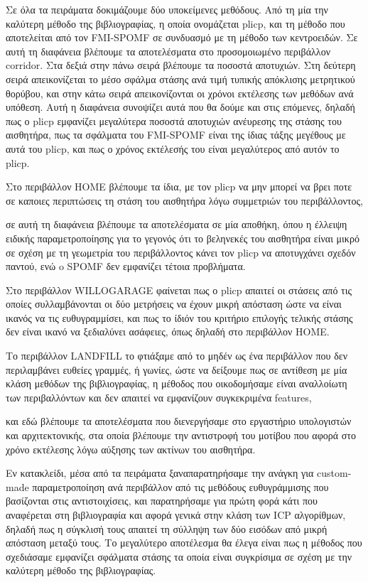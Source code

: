 \documentclass[a4paper,10pt]{article}
\begin{document}
Σε όλα τα πειράματα δοκιμάζουμε δύο υποκείμενες μεθόδους. Από τη μία την
καλύτερη μέθοδο της βιβλιογραφίας, η οποία ονομάζεται plicp, και τη μέθοδο που
αποτελείται από τον FMI-SPOMF σε συνδυασμό με τη μέθοδο των κεντροειδών. Σε
αυτή τη διαφάνεια βλέπουμε τα αποτελέσματα στο προσομοιωμένο περιβάλλον
corridor. Στα δεξιά στην πάνω σειρά βλέπουμε τα ποσοστά αποτυχιών. Στη δεύτερη
σειρά απεικονίζεται το μέσο σφάλμα στάσης ανά τιμή τυπικής απόκλισης μετρητικού
θορύβου, και στην κάτω σειρά απεικονίζονται οι χρόνοι εκτέλεσης των μεθόδων ανά
υπόθεση. Αυτή η διαφάνεια συνοψίζει αυτά που θα δούμε και στις επόμενες, δηλαδή
πως ο plicp εμφανίζει μεγαλύτερα ποσοστά αποτυχιών ανέυρεσης της στάσης του
αισθητήρα, πως τα σφάλματα του FMI-SPOMF είναι της ίδιας τάξης μεγέθους με αυτά
του plicp, και πως ο χρόνος εκτέλεσής του είναι μεγαλύτερος από αυτόν το plicp.

Στο περιβάλλον HOME βλέπουμε τα ίδια, με τον plicp να μην μπορεί να βρει ποτε
σε καποιες περιπτώσεις τη στάση του αισθητήρα λόγω συμμετριών του
περιβάλλοντος,

σε αυτή τη διαφάνεια βλέπουμε τα αποτελέσματα σε μία αποθήκη, όπου  η έλλειψη
ειδικής παραμετροποίησης για το γεγονός ότι το βεληνεκές του αισθητήρα είναι
μικρό σε σχέση με τη γεωμετρία του περιβάλλοντος κάνει τον plicp να αποτυγχάνει
σχεδόν παντού, ενώ o SPOMF δεν εμφανίζει τέτοια προβλήματα.

Στο περιβάλλον WILLOGARAGE φαίνεται πως ο plicp απαιτεί οι στάσεις από τις
οποίες συλλαμβάνονται οι δύο μετρήσεις να έχουν μικρή απόσταση ώστε να είναι
ικανός να τις ευθυγραμμίσει, και πως το ίδιόν του κριτήριο επιλογής τελικής
στάσης δεν είναι ικανό να ξεδιαλύνει ασάφειες, όπως δηλαδή στο περιβάλλον HOME.

Το περιβάλλον LANDFILL το φτιάξαμε από το μηδέν ως ένα περιβάλλον που δεν
περιλαμβάνει ευθείες γραμμές, ή γωνίες, ώστε να δείξουμε πως σε αντίθεση με μία
κλάση μεθόδων της βιβλιογραφίας, η μέθοδος που οικοδομήσαμε είναι αναλλοίωτη
των περιβαλλόντων και δεν απαιτεί να εμφανίζουν συγκεκριμένα features,

και εδώ βλέπουμε τα αποτελέσματα που διενεργήσαμε στο εργαστήριο υπολογιστών
και αρχιτεκτονικής, στα οποία βλέπουμε την αντιστροφή του μοτίβου που αφορά στο
χρόνο εκτέλεσης λόγω αύξησης των ακτίνων του αισθητήρα.


Εν κατακλείδι, μέσα από τα πειράματα ξαναπαρατηρήσαμε την ανάγκη για
custom-made παραμετροποίηση ανά περιβάλλον από τις μεθόδους ευθυγράμμισης που
βασίζονται στις αντιστοιχίσεις, και παρατηρήσαμε για πρώτη φορά κάτι που
αναφέρεται στη βιβλιογραφία και αφορά γενικά στην κλάση των ICP αλγορίθμων,
δηλαδή πως η σύγκλισή τους απαιτεί τη σύλληψη των δύο εισόδων από μικρή
απόσταση μεταξύ τους. Το μεγαλύτερο αποτέλεσμα θα έλεγα είναι πως η μέθοδος που
σχεδιάσαμε εμφανίζει σφάλματα στάσης τα οποία είναι συγκρίσιμα σε σχέση με την
καλύτερη μέθοδο της βιβλιογραφίας.
\end{document}
